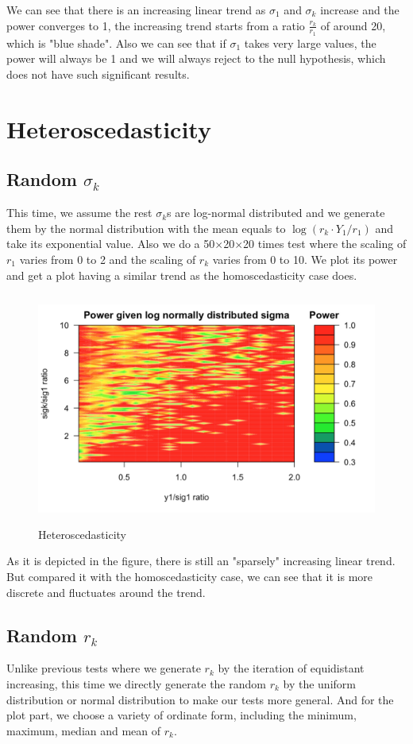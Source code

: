 \documentclass[10pt,english]{article}\usepackage{graphicx, color}
\numberwithin{equation}{section}
\numberwithin{figure}{section}
\begin{document}
We can see that there is an increasing linear trend as $\sigma_1$ and $\sigma_k$ increase and the power converges to 1, the increasing trend starts from a ratio $\frac{r_k}{r_1}$ of around 20, which is "blue shade". Also we can see that if $\sigma_1$ takes very large values, the power will always be 1 and we will always reject to the null hypothesis, which does not have such significant results.

\section{Heteroscedasticity}
\subsection{Random $\sigma_k$}
This time, we assume the rest  $\sigma_k$s are log-normal distributed and we generate them by the normal distribution with the mean equals to $\log(r_k\cdot Y_1/r_1)$ and take its exponential value. Also we do a 50$\times$20$\times$20 times test where the scaling of $r_1$ varies from 0 to 2 and the scaling of $r_k$ varies from 0 to 10. We plot its power and get a plot having a similar trend as the homoscedasticity case does.
\begin{figure}[htbp]
\centering\includegraphics[width=4.5in,height=3in]{hetero}
\caption{Heteroscedasticity}
\end{figure}

As it is depicted in the figure, there is still an "sparsely" increasing linear trend. But compared it with the homoscedasticity case, we can see that it is more discrete and fluctuates around the trend.

\subsection{Random $r_k$}
Unlike previous tests where we generate $r_k$ by the iteration of equidistant increasing, this time we directly generate the random $r_k$ by the uniform distribution or normal distribution to make our tests more general. And for the plot part, we choose a variety of ordinate form, including the minimum, maximum, median and mean of $r_k$.
\end{document}

